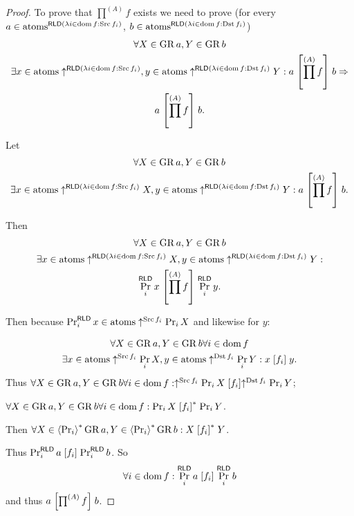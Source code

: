 \begin{proof}
To prove that $\prod^{(A)}f$ exists we need to prove (for every $a\in\atoms^{\mathsf{RLD}(\mylamdba i{\dom f}{\Src f_{i}})}$,
$b\in\atoms^{\mathsf{RLD}(\mylamdba i{\dom f}{\Dst f_{i}})}$)
\begin{multline*}
\forall X\in\GR a,Y\in\GR b\\
\exists x\in\atoms\uparrow^{\mathsf{RLD}(\mylamdba i{\dom f}{\Src f_{i}})},y\in\atoms\uparrow^{\mathsf{RLD}(\mylamdba i{\dom f}{\Dst f_{i}})}Y:a\suprel{\prod^{(A)}f}b\Rightarrow\\
a\suprel{\prod^{(A)}f}b.
\end{multline*}


Let
\begin{multline*}
\forall X\in\GR a,Y\in\GR b\\
\exists x\in\atoms\uparrow^{\mathsf{RLD}(\mylamdba i{\dom f}{\Src f_{i}})}X,y\in\atoms\uparrow^{\mathsf{RLD}(\mylamdba i{\dom f}{\Dst f_{i}})}Y:a\suprel{\prod^{(A)}f}b.
\end{multline*}


Then
\begin{multline*}
\forall X\in\GR a,Y\in\GR b\\
\exists x\in\atoms\uparrow^{\mathsf{RLD}(\mylamdba i{\dom f}{\Src f_{i}})}X,y\in\atoms\uparrow^{\mathsf{RLD}(\mylamdba i{\dom f}{\Dst f_{i}})}Y:\\
\Pr_{i}^{\mathsf{RLD}}x\suprel{\prod^{(A)}f}\Pr_{i}^{\mathsf{RLD}}y.
\end{multline*}


Then because $\Pr_{i}^{\mathsf{RLD}}x\in\atoms\uparrow^{\Src f_{i}}\Pr_{i}X$
and likewise for $y$:

\begin{multline*}
\forall X\in\GR a,Y\in\GR b\forall i\in\dom f\\
\exists x\in\atoms\uparrow^{\Src f_{i}}\Pr_{i}X,y\in\atoms\uparrow^{\Dst f_{i}}\Pr_{i}Y:x\suprel{f_{i}}y.
\end{multline*}
Thus $\forall X\in\GR a,Y\in\GR b\forall i\in\dom f:\uparrow^{\Src f_{i}}\Pr_{i}X\suprel{f_{i}}\uparrow^{\Dst f_{i}}\Pr_{i}Y$;

$\forall X\in\GR a,Y\in\GR b\forall i\in\dom f:\Pr_{i}X\rsuprel{f_{i}}\Pr_{i}Y$.

Then $\forall X\in\rsupfun{\Pr_{i}}\GR a,Y\in\rsupfun{\Pr_{i}}\GR b:X\rsuprel{f_{i}}Y$.

Thus $\Pr_{i}^{\mathsf{RLD}}a\suprel{f_{i}}\Pr_{i}^{\mathsf{RLD}}b$.
So 
\[
\forall i\in\dom f:\Pr_{i}^{\mathsf{RLD}}a\suprel{f_{i}}\Pr_{i}^{\mathsf{RLD}}b
\]
and thus $a\suprel{\prod^{(A)}f}b$.\end{proof}
